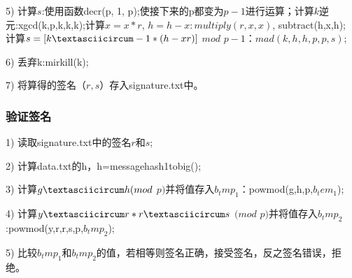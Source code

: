 5)  计算$s$:使用函数decr(p, 1, p);使接下来的p都变为$p-1$进行运算；计算$k$逆元:xgcd(k,p,k,k,k);计算$x=x*r$, $h=h-x:multiply(r,x,x)$, subtract(h,x,h); 计算$s=[k\textasciicircum -1*(h-xr)]$ $mod$ $p-1$：$mad(k, h, h, p, p, s)$; 

6)  丢弃k:mirkill(k);

7)  将算得的签名$（r,s）$存入signature.txt中。

\subsubsection{验证签名}

1)    读取signature.txt中的签名$r$和$s$;

2)    计算data.txt的h，h=messagehash1tobig();

3)    计算$g\textasciicircum h(mod$ $p)$并将值存入$b_tmp_1$：powmod(g,h,p,$b_tem_1$);

4)    计算$y\textasciicircum r*r\textasciicircum s$ $(mod$ $p)$并将值存入$b_tmp_2$:powmod(y,r,r,s,p,$b_tmp_2$);

5)    比较$b_tmp_1$和$b_tmp_2$的值，若相等则签名正确，接受签名，反之签名错误，拒绝\cite{Provabl}\cite{jiyulisanduishu}。
